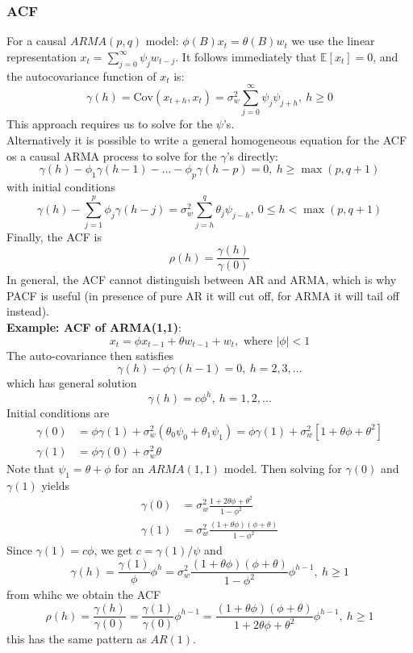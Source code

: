 \documentclass[11pt]{article}
\newcommand{\noi}{\noindent}
\begin{document}
\subsubsection{ACF}
\noi For a causal $ARMA(p,q)$ model: $\phi(B)x_t = \theta(B)w_t$ we use the linear representation $x_t = \sum_{j=0}^{\infty}\psi_jw_{t-j}$. It follows immediately that $\mathbb{E}[x_t] = 0$, and the autocovariance function of $x_t$ is:
$$\gamma(h) = \text{Cov}(x_{t+h}, x_t) = \sigma_w^2\sum_{j=0}^{\infty}{\psi_j\psi_{j+h}}, \: h \geq 0$$
\noi This approach requires us to solve for the $\psi$'s. \\

\noi Alternatively it is possible to write a general homogeneous equation for the ACF os a causal ARMA process to solve for the $\gamma$'s directly:
$$\gamma(h) - \phi_1\gamma(h-1) - ... - \phi_p\gamma(h-p) = 0, \: h \geq \max(p, q+1)$$
\noi with initial conditions
$$\gamma(h) - \sum_{j=1}^{p}{\phi_j\gamma(h-j)} = \sigma_w^2\sum_{j=h}^{q}\theta_j\psi_{j-h}, \: 0 \leq h < \max(p, q+1)$$
\noi Finally, the ACF is
$$\rho(h) = \frac{\gamma(h)}{\gamma(0)}$$
\noi In general, the ACF cannot distinguish between AR and ARMA, which is why PACF is useful (in presence of pure AR it will cut off, for ARMA it will tail off instead). \\

\noi \textbf{Example: ACF of ARMA(1,1)}:
$$x_t = \phi x_{t-1} + \theta w_{t-1} + w_t, \text{ where } |\phi| < 1$$
\noi The auto-covariance then satisfies
$$\gamma(h) - \phi \gamma(h-1) = 0, \: h=2,3,...$$
\noi which has general solution
$$\gamma(h) = c\phi^h, \: h=1,2,...$$
\noi Initial conditions are 
\begin{align*}
    \gamma(0) &= \phi \gamma(1) + \sigma_w^2(\theta_0\psi_0 + \theta_1\psi_1) = \phi\gamma(1) + \sigma_w^2[1 + \theta\phi + \theta^2] \\
    \gamma(1) &= \phi\gamma(0) + \sigma_w^2\theta
\end{align*}
\noi Note that $\psi_1 = \theta + \phi$ for an $ARMA(1,1)$ model. Then solving for $\gamma(0)$ and $\gamma(1)$ yields
\begin{align*}
    \gamma(0) &= \sigma_w^2\frac{1+2\theta\phi + \theta^2}{1-\phi^2} \\
    \gamma(1) &= \sigma_w^2\frac{(1+\theta\phi)(\phi + \theta)}{1 - \phi^2}
\end{align*}
\noi Since $\gamma(1) = c\phi$, we get $c = \gamma(1)/\psi$ and
$$\gamma(h) = \frac{\gamma(1)}{\phi}\phi^h = \sigma_w^2\frac{(1 + \theta\phi)(\phi + \theta)}{1-\phi^2}\phi^{h-1}, \: h \geq 1$$
\noi from whihc we obtain the ACF
$$\rho(h) = \frac{\gamma(h)}{\gamma(0)} = \frac{\gamma(1)}{\gamma(0)}\phi^{h-1} = \frac{(1+\theta\phi)(\phi + \theta)}{1 + 2\theta\phi + \theta^2}\phi^{h-1}, \: h \geq 1$$
\noi this has the same pattern as $AR(1)$.
\end{document}
